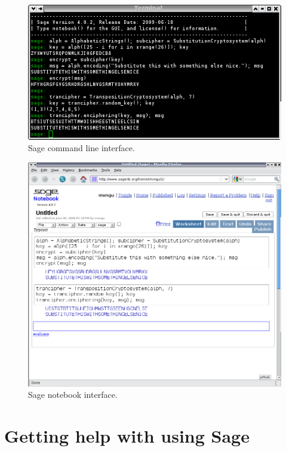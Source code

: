 \begin{figure}[!htpb]
\centering
\includegraphics[scale=0.5]{figures/sage-cmd}
\caption{Sage command line interface.}
\label{fig:sage_cmd_interfaces}
\end{figure}

\begin{figure}[!htpb]
\centering
\includegraphics[scale=0.4]{figures/sage-gui}
\caption{Sage notebook interface.}
\label{fig:sage_gui_interfaces}
\end{figure}


\newpage
\section*{Getting help with using Sage}

